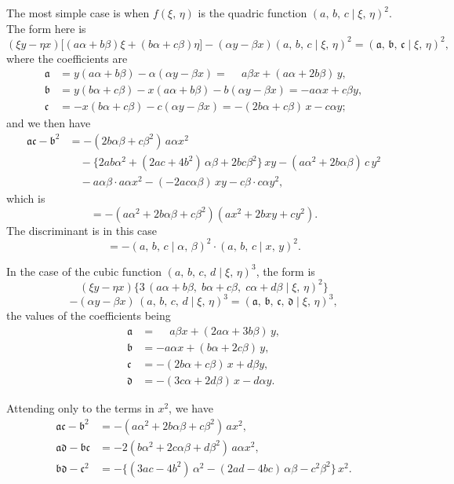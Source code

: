 \documentclass[11pt]{article}
\begin{document}
The most simple case is when $f(\xi,\,\eta)$ is the quadric function $(a,\,b,\,c \mid \xi,\,\eta)^2$.
The form here is
\[
   (\xi y - \eta x)\bigl[(a\alpha + b\beta)\xi + (b\alpha + c\beta)\eta\bigr] - (\alpha y - \beta x)(a,\,b,\,c \mid \xi,\,\eta)^2 = (\mathfrak{a},\,\mathfrak{b},\,\mathfrak{c} \mid \xi,\,\eta)^2,
\]
where the coefficients are
\begin{align*}
\mathfrak{a} &= y(a\alpha + b\beta) - \alpha(\alpha y - \beta x) = \phantom{-}a\beta x + (a\alpha + 2b\beta)\,y,\\
\mathfrak{b} &= y(b\alpha + c\beta) - x(a\alpha + b\beta) - b(\alpha y - \beta x) = -a\alpha x + c\beta y,\\
\mathfrak{c} &= -x(b\alpha + c\beta) - c(\alpha y - \beta x) = -(2b\alpha + c\beta)\,x - c\alpha y;
\end{align*}
and we then have
\begin{align*}
\mathfrak{a}\mathfrak{c} - \mathfrak{b}^2
 &= -(2b\alpha\beta + c\beta^2)\,a\alpha x^2 \\
 &\quad - \bigl\{2ab\alpha^2 + (2ac + 4b^2)\,\alpha\beta + 2bc\beta^2\bigr\}\,xy - (a\alpha^2 + 2b\alpha\beta)\,c\,y^2 \\
 &\quad - a\alpha\beta\cdot a\alpha x^2 - (-2ac\alpha\beta)\,xy - c\beta\cdot c\alpha y^2,
\end{align*}
which is
\[
   = -(a\alpha^2 + 2b\alpha\beta + c\beta^2)(ax^2 + 2bxy + cy^2).
\]
The discriminant is in this case
\[
   = -(a,\,b,\,c \mid \alpha,\,\beta)^2\cdot(a,\,b,\,c \mid x,\,y)^2.
\]

In the case of the cubic function $(a,\,b,\,c,\,d \mid \xi,\,\eta)^3$, the form is
\[
   (\xi y - \eta x)\bigl\{3\,(a\alpha + b\beta,\;b\alpha + c\beta,\;c\alpha + d\beta \mid \xi,\,\eta)^2\bigr\}
\]
\[
   - (\alpha y - \beta x)\,(a,\,b,\,c,\,d \mid \xi,\,\eta)^3 = (\mathfrak{a},\,\mathfrak{b},\,\mathfrak{c},\,\mathfrak{d} \mid \xi,\,\eta)^3,
\]
the values of the coefficients being
\begin{align*}
\mathfrak{a} &= \phantom{-}a\beta x + (2a\alpha + 3b\beta)\,y,\\
\mathfrak{b} &= -a\alpha x + (b\alpha + 2c\beta)\,y,\\
\mathfrak{c} &= -(2b\alpha + c\beta)\,x + d\beta y,\\
\mathfrak{d} &= -(3c\alpha + 2d\beta)\,x - d\alpha y.
\end{align*}

Attending only to the terms in $x^2$, we have
\begin{align*}
\mathfrak{a}\mathfrak{c} - \mathfrak{b}^2 &= -(a\alpha^2 + 2b\alpha\beta + c\beta^2)\,ax^2,\\
\mathfrak{a}\mathfrak{d} - \mathfrak{b}\mathfrak{c} &= -2(b\alpha^2 + 2c\alpha\beta + d\beta^2)\,a\alpha x^2,\\
\mathfrak{b}\mathfrak{d} - \mathfrak{c}^2 &= -\bigl\{(3ac - 4b^2)\,\alpha^2 - (2ad - 4bc)\,\alpha\beta - c^2\beta^2\bigr\}\,x^2.
\end{align*}
\end{document}

